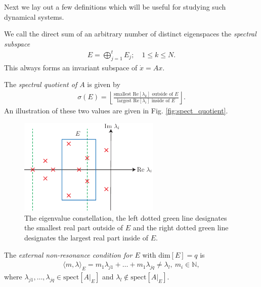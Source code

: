 Next we lay out a few definitions which will be useful for studying such dynamical systems.

\begin{definition}
We call the direct sum of an arbitrary number of distinct eigenspaces the \emph{spectral subspace} 
\begin{align}
E = \bigoplus_{j=1}^{t}E_{j};\quad 1 \leq k \leq N.	
\end{align}
This always forms an invariant subspace of $\dot{x}=Ax$.
\end{definition}
\begin{definition}

The \emph{spectral quotient of $A$} is given by
\begin{align}
	\sigma(E) = \left\lfloor \frac{ \textrm{smallest Re} [\lambda _k] \textrm{ outside of }E}{ \textrm{largest Re} [\lambda _i]  \textrm{ inside of } E}\right\rfloor.
\end{align}
An illustration of these two values are given in Fig. \ref{fig:spect_quotient}.
\begin{figure}[h!]
	\centering
	\includegraphics[width=0.6\textwidth]{figures/ch9/26spect_quot.pdf}
	\caption{The eigenvalue constellation, the left dotted green line designates the smallest real part outside of $E$ and the right dotted green line designates the largest real part inside of $E$.}
	\label{fig:spect_quotient2}
\end{figure}
\end{definition}

\begin{definition}
The \emph{external non-resonance condition for $E$} with $ \textrm{dim} [E]=q$ is
\begin{align}
	\langle m, \lambda \rangle_{E} = m_1 \lambda _{j1} + \ldots + m_1 \lambda _{jq} \neq \lambda_l,\ m_i \in \mathbb{N}	,
\end{align} 
where $\lambda _{j1},\ldots,\lambda _{jq}\in  \textrm{spect}[A|_{E}] $ and $\lambda _{l} \not \in  \textrm{spect} [A|_{E}]$.
\end{definition}

